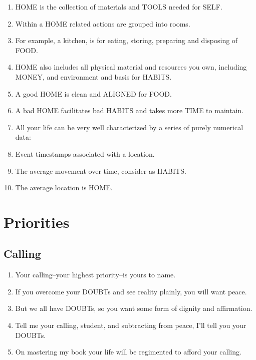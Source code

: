\documentclass[
]{book}
\begin{document}
\begin{enumerate}
\def\labelenumi{\arabic{enumi}.}
\setcounter{enumi}{58}
\item
  HOME is the collection of materials and TOOLS needed for SELF.
\item
  Within a HOME related actions are grouped into rooms.
\item
  For example, a kitchen, is for eating, storing, preparing and disposing of FOOD.
\item
  HOME also includes all physical material and resources you own, including
  MONEY, and environment and basis for HABITS.
\item
  A good HOME is clean and ALIGNED for FOOD.
\item
  A bad HOME facilitates bad HABITS and takes more TIME to maintain.
\item
  All your life can be very well characterized by a series of purely numerical data:
\item
  Event timestamps associated with a location.
\item
  The average movement over time, consider as HABITS.
\item
  The average location is HOME.
\end{enumerate}

\hypertarget{priorities}{%
\chapter{Priorities}\label{priorities}}

\hypertarget{calling}{%
\section{Calling}\label{calling}}

\begin{enumerate}
\def\labelenumi{\arabic{enumi}.}
\item
  Your calling--your highest priority--is yours to name.
\item
  If you overcome your DOUBTs and see reality plainly, you will want peace.\\
\item
  But we all have DOUBTs, so you want some form of dignity and affirmation.
\item
  Tell me your calling, student, and subtracting from peace, I'll tell you your DOUBTs.
\item
  On mastering my book your life will be regimented to afford your calling.
\end{enumerate}
\end{document}
